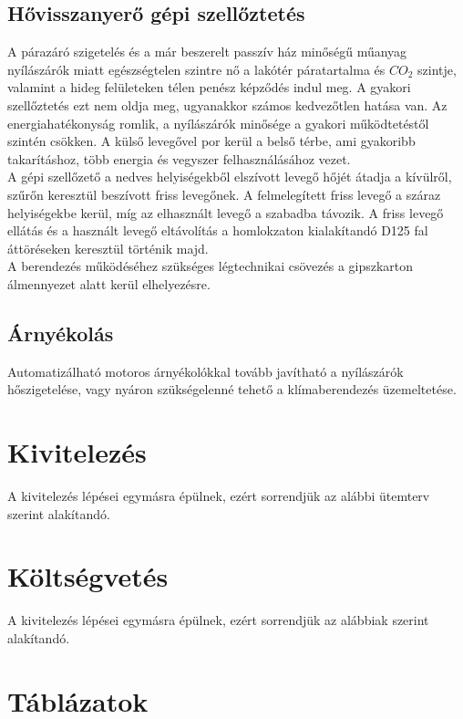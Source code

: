 \subsection{Hővisszanyerő gépi szellőztetés}
\label{sec:szellozo}
A párazáró szigetelés és a már beszerelt passzív ház minőségű műanyag nyílászárók miatt egészségtelen szintre nő
a lakótér páratartalma és $CO_2$ szintje, valamint a hideg felületeken télen penész képződés indul meg. A gyakori szellőztetés ezt
nem oldja meg, ugyanakkor számos kedvezőtlen hatása van. Az energiahatékonyság romlik, a nyílászárók minősége
a gyakori működtetéstől szintén csökken. A külső levegővel por kerül a belső térbe, ami gyakoribb takarításhoz,
több energia és vegyszer felhasználásához vezet. \\

A gépi szellőzető a nedves helyiségekből elszívott levegő hőjét átadja a kívülről, szűrőn keresztül 
beszívott friss levegőnek. A felmelegített friss levegő a száraz helyiségekbe kerül, míg az elhasznált levegő
a szabadba távozik. A friss levegő ellátás és a használt levegő eltávolítás a homlokzaton kialakítandó D125
fal áttöréseken keresztül történik majd. \\

A berendezés működéséhez szükséges légtechnikai csövezés a gipszkarton álmennyezet alatt kerül elhelyezésre.

\subsection{Árnyékolás}
\label{sec:arnyekolas}
Automatizálható motoros árnyékolókkal tovább javítható a nyílászárók hőszigetelése, vagy nyáron 
szükségelenné tehető a klímaberendezés üzemeltetése.

\section{Kivitelezés}
\label{sec:sorrend}
A kivitelezés lépései egymásra épülnek, ezért sorrendjük az alábbi ütemterv szerint alakítandó.

\section{Költségvetés}
\label{sec:koltsegvetes}
A kivitelezés lépései egymásra épülnek, ezért sorrendjük az alábbiak szerint alakítandó.

\clearpage
\section{Táblázatok}
\label{sec:tablazatok}


